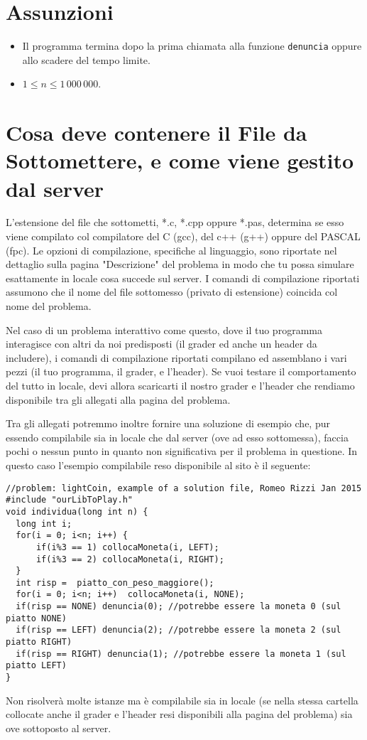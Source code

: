 \documentclass[a4paper,11pt]{article}
\begin{document}
  \section*{Assunzioni}
  \begin{itemize}[nolistsep, noitemsep]
    \item Il programma termina dopo la prima chiamata alla funzione \texttt{denuncia} oppure allo scadere del tempo limite.
    \item $1 \le n \le 1\,000\,000$.
  \end{itemize}


  \section*{Cosa deve contenere il File da Sottomettere, e come viene gestito dal server}

  L'estensione del file che sottometti, *.c, *.cpp oppure *.pas,
  determina se esso viene compilato col compilatore del C (gcc),
  del c++ (g++) oppure del PASCAL (fpc).
  Le opzioni di compilazione, specifiche al linguaggio,
  sono riportate nel dettaglio sulla pagina "Descrizione" del problema
  in modo che tu possa simulare esattamente in locale cosa succede sul server.
  I comandi di compilazione riportati assumono che il nome del file sottomesso (privato di estensione) coincida col nome del problema.

  Nel caso di un problema interattivo come questo,
  dove il tuo programma interagisce con altri da noi predisposti
  (il grader ed anche un header da includere), i comandi di compilazione riportati compilano ed assemblano i vari pezzi (il tuo programma, il grader, e l'header).
  Se vuoi testare il comportamento del tutto in locale,
  devi allora scaricarti il nostro grader e l'header che rendiamo disponibile tra gli allegati alla pagina del problema.

  Tra gli allegati potremmo inoltre fornire una soluzione di esempio che,
  pur essendo compilabile sia in locale che dal server (ove ad esso sottomessa),
  faccia pochi o nessun punto in quanto non significativa per il problema
  in questione.
  In questo caso l'esempio compilabile reso disponibile al sito \`e il seguente:
\begin{verbatim}
//problem: lightCoin, example of a solution file, Romeo Rizzi Jan 2015
#include "ourLibToPlay.h"
void individua(long int n) {
  long int i;
  for(i = 0; i<n; i++) {
      if(i%3 == 1) collocaMoneta(i, LEFT);
      if(i%3 == 2) collocaMoneta(i, RIGHT);
  }
  int risp =  piatto_con_peso_maggiore();
  for(i = 0; i<n; i++)  collocaMoneta(i, NONE);
  if(risp == NONE) denuncia(0); //potrebbe essere la moneta 0 (sul piatto NONE)
  if(risp == LEFT) denuncia(2); //potrebbe essere la moneta 2 (sul piatto RIGHT) 
  if(risp == RIGHT) denuncia(1); //potrebbe essere la moneta 1 (sul piatto LEFT)
}
\end{verbatim}

Non risolver\`a molte istanze ma \`e compilabile sia in locale (se nella stessa cartella collocate anche il grader e l'header resi disponibili alla pagina del problema) sia ove sottoposto al server.
  
  
\end{document}
